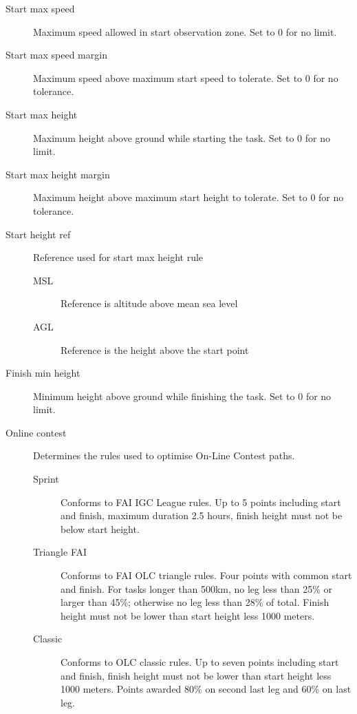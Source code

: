 \documentclass[a4paper,12pt]{refrep}
\begin{document}
\begin{description}
\item[Start max speed]  Maximum speed allowed in start observation zone.  Set to 0 for no limit.
\item[Start max speed margin] Maximum speed above maximum start speed to tolerate.  Set to 0 for no tolerance.
\item[Start max height]  Maximum height above ground while starting the task.  Set to 0 for no limit.
\item[Start max height margin]  Maximum height above maximum start height to tolerate.  Set to 0 for no tolerance.
\item[Start height ref]  Reference used for start max height rule
\begin{description}
\item[MSL] Reference is altitude above mean sea level
\item[AGL] Reference is the height above the start point
\end{description}
\item[Finish min height]  Minimum height above ground while finishing the task.  Set to 0 for no limit. 
\item[Online contest] Determines the rules used to optimise On-Line Contest paths. 
\begin{description}
\item[Sprint]  Conforms to FAI IGC League rules.  Up to 5 points including start and finish, maximum duration 2.5 hours, finish height must not be below start height.
\item[Triangle FAI]  Conforms to FAI OLC triangle rules.  Four points with common start and finish.  For tasks longer than 500km, no leg less than 25\% or larger than 45\%; otherwise no leg less than 28\% of total.  Finish height must not be lower than start height less 1000 meters.
\item[Classic]  Conforms to OLC classic rules.  Up to seven points including start and finish, finish height must not be lower than start height less 1000 meters.  Points awarded 80\% on second last leg and 60\% on last leg.
\end{description}
\end{description}

\clearpage
\section{{\InfoBox}}
\end{document}
